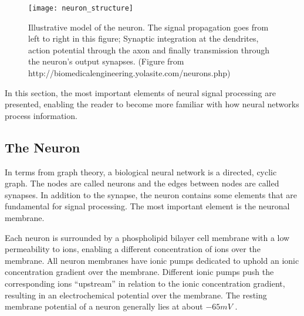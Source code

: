 \begin{figure}[hbt!p]
	\centering
	\texttt{[image: neuron\_structure]}%
	\caption[Illustrative model of the neuron]
			{Illustrative model of the neuron. The signal propagation goes from left to right in this figure;
			Synaptic integration at the dendrites, action potential through the axon and finally transmission through the neuron's output synapses. 
			(Figure from {\tiny http://biomedicalengineering.yolasite.com/neurons.php})
			}
	\label{figFigurAvNeuronet}
\end{figure}
	
	In this section, the most important elements of neural signal processing are presented, enabling the reader to become more familiar with how neural networks process information.





		
	

	\subsection{The Neuron}
		In terms from graph theory, a biological neural network is a directed, cyclic graph.
		The nodes are called neurons and the edges between nodes are called synapses.
		In addition to the synapse, the neuron contains some elements that are fundamental for signal processing.
		The most important element is the neuronal membrane. 



		Each neuron is surrounded by a phospholipid bilayer cell membrane with a low permeability to ions, enabling a different concentration of ions over the membrane.
		All neuron membranes have ionic pumps dedicated to uphold an ionic concentration gradient over the membrane.
		Different ionic pumps push the corresponding ions ``upstream'' in relation to the ionic concentration gradient, resulting in an electrochemical potential over the membrane.
		The resting membrane potential of a neuron generally lies at about $-65mV$
		\cite{NeuroscienceExploringTheBrain3ed, PrinciplesOfNeuralScience4edKAP07}. %

